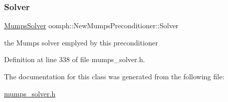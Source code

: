 \subsubsection{\texorpdfstring{Solver}{Solver}}
{\footnotesize\ttfamily \hyperlink{classoomph_1_1MumpsSolver}{Mumps\+Solver} oomph\+::\+New\+Mumps\+Preconditioner\+::\+Solver\hspace{0.3cm}{\ttfamily [private]}}



the Mumps solver emplyed by this preconditioner 



Definition at line 338 of file mumps\+\_\+solver.\+h.



The documentation for this class was generated from the following file\+:\begin{DoxyCompactItemize}
\item 
\hyperlink{mumps__solver_8h}{mumps\+\_\+solver.\+h}\end{DoxyCompactItemize}
